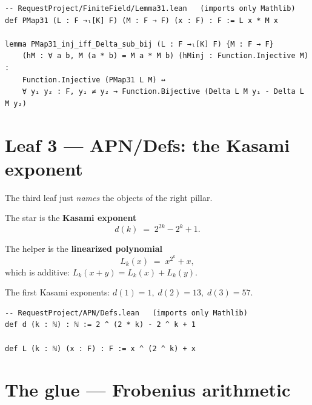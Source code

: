 \documentclass[11pt]{article}
\begin{document}
\begin{lstlisting}
-- RequestProject/FiniteField/Lemma31.lean   (imports only Mathlib)
def PMap31 (L : F →ₗ[K] F) (M : F → F) (x : F) : F := L x * M x

lemma PMap31_inj_iff_Delta_sub_bij (L : F →ₗ[K] F) {M : F → F}
    (hM : ∀ a b, M (a * b) = M a * M b) (hMinj : Function.Injective M) :
    Function.Injective (PMap31 L M) ↔
    ∀ y₁ y₂ : F, y₁ ≠ y₂ → Function.Bijective (Delta L M y₁ - Delta L M y₂)
\end{lstlisting}

\section{Leaf 3 --- APN/Defs: the Kasami exponent}

The third leaf just \emph{names} the objects of the right pillar.

The star is the \textbf{Kasami exponent}
\[
  d(k) \;=\; 2^{2k} - 2^{k} + 1 .
\]

The helper is the \textbf{linearized polynomial}
\[
  L_k(x) \;=\; x^{2^{k}} + x ,
\]
which is additive: $L_k(x+y) = L_k(x) + L_k(y)$.

\begin{center}

{\small The first Kasami exponents: $d(1)=1,\; d(2)=13,\; d(3)=57$.}
\end{center}

\begin{lstlisting}
-- RequestProject/APN/Defs.lean   (imports only Mathlib)
def d (k : ℕ) : ℕ := 2 ^ (2 * k) - 2 ^ k + 1

def L (k : ℕ) (x : F) : F := x ^ (2 ^ k) + x
\end{lstlisting}

\section{The glue --- Frobenius arithmetic}
\end{document}
